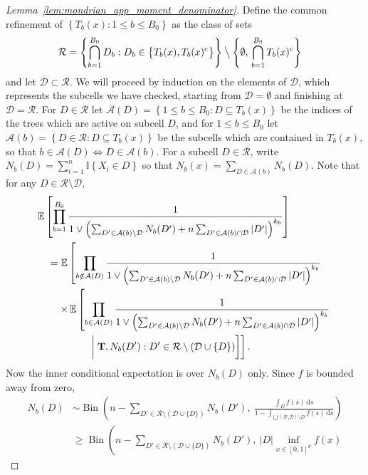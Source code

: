 \documentclass[11pt,lof]{puthesis}
\newcommand{\E}{\ensuremath{\mathbb{E}}}
\newcommand{\I}{\ensuremath{\mathbb{I}}}
\newcommand{\comp}{\ensuremath{\mathrm{c}}}
\newcommand{\bT}{\ensuremath{\mathbf{T}}}
\newcommand{\cR}{\ensuremath{\mathcal{R}}}
\newcommand{\cA}{\ensuremath{\mathcal{A}}}
\newcommand{\cD}{\ensuremath{\mathcal{D}}}
\newcommand{\bigsetminus}{\mathbin{\big\backslash}}
\DeclareMathOperator{\Bin}{Bin}
\newcommand{\diff}[1]{\,\mathrm{d}#1}
\theoremstyle{break}
\theoremstyle{proof}
\newtheorem{proof}{Proof}
\begin{document}
\begin{proof}[Lemma~\ref{lem:mondrian_app_moment_denominator}]

Define the common refinement of
$\left\{ T_b(x) : 1 \leq b \leq {B_0} \right\}$ as
the class of sets
%
\begin{align*}
\cR
&= \left\{ \bigcap_{b=1}^{B_0} D_b :
D_b \in
\big\{ T_b(x), T_b(x)^{\comp} \big\}
\right\}
\bigsetminus
\left\{
\emptyset,\,
\bigcap_{b=1}^{B_0}
T_b(x)^\comp
\right\}
\end{align*}
%
and let $\cD \subset \cR$.
We will proceed by induction on the elements of $\cD$,
which represents the subcells we have checked,
starting from $\cD = \emptyset$ and finishing at $\cD = \cR$.
For $D \in \cR$ let
$\cA(D) = \left\{ 1 \leq b \leq {B_0} : D \subseteq T_b(x) \right\}$
be the indices of the trees which are active on subcell $D$,
and for $1 \leq b \leq {B_0}$ let
$\cA(b) = \left\{ D \in \cR : D \subseteq T_b(x) \right\}$
be the subcells which are contained in $T_b(x)$,
so that $b \in \cA(D) \iff D \in \cA(b)$.
For a subcell $D \in \cR$,
write $N_b(D) = \sum_{i=1}^{n} \I \left\{ X_i \in D \right\}$
so that $N_b(x) = \sum_{D \in \cA(b)} N_b(D)$.
Note that for any $D \in \cR \setminus \cD$,
%
\begin{align*}
&\E \left[
\prod_{b=1}^{B_0}
\frac{1}{
1 \vee \left(
\sum_{D' \in \cA(b) \setminus \cD}
N_b(D')
+ n \sum_{D' \in \cA(b) \cap \cD}
|D'|
\right)^{k_b}
}
\right] \\
&\quad=
\E \left[
\prod_{b \notin \cA(D)}
\frac{1}{
1 \vee \left(
\sum_{D' \in \cA(b) \setminus \cD}
N_b(D')
+ n \sum_{D' \in \cA(b) \cap \cD}
|D'|
\right)^{k_b}
} \right. \\
&\left.
\qquad
\times\,\E\left[
\prod_{b \in \cA(D)}
\frac{1}{
1 \vee \left(
\sum_{D' \in \cA(b) \setminus \cD}
N_b(D')
+ n \sum_{D' \in \cA(b) \cap \cD}
|D'|
\right)^{k_b}
} \right.\right. \\
&\left.\left.
\quad\qquad\qquad\biggm|
\bT,
N_b(D') : D' \in \cR
\setminus
(\cD \cup \{D\})
\right]
\right].
\end{align*}
%
Now the inner conditional expectation is over $N_b(D)$ only.
Since $f$ is bounded away from zero,
%
\begin{align*}
N_b(D)
&\sim \Bin\left(
n - \sum_{D' \in \cR \setminus (\cD \cup \{D\})} N_b(D'), \
\frac{\int_{D} f(s) \diff s}
{1 - \int_{\bigcup \left( \cR \setminus \cD \right) \setminus D}
f(s) \diff s}
\right) \\
&\geq \Bin\left(
n - \sum_{D' \in \cR \setminus (\cD \cup \{D\})} N_b(D'), \
|D| \inf_{x \in [0,1]^d} f(x)

\end{align*}
\end{proof}
\end{document}
